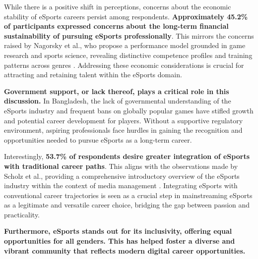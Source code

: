 \documentclass[manuscript,screen,review,anonymous]{acmart}
\begin{document}
While there is a positive shift in perceptions, concerns about the economic stability of eSports careers persist among respondents. \textbf{Approximately 45.2\% of participants expressed concerns about the long-term financial sustainability of pursuing eSports professionally}. This mirrors the concerns raised by Nagorsky et al., who propose a performance model grounded in game research and sports science, revealing distinctive competence profiles and training patterns across genres \cite{a14}. Addressing these economic considerations is crucial for attracting and retaining talent within the eSports domain.

\textbf{Government support, or lack thereof, plays a critical role in this discussion.} In Bangladesh, the lack of governmental understanding of the eSports industry and frequent bans on globally popular games have stifled growth and potential career development for players. Without a supportive regulatory environment, aspiring professionals face hurdles in gaining the recognition and opportunities needed to pursue eSports as a long-term career.

Interestingly, \textbf{53.7\% of respondents desire greater integration of eSports with traditional career paths}. This aligns with the observations made by Scholz et al., providing a comprehensive introductory overview of the eSports industry within the context of media management \cite{a22}. Integrating eSports with conventional career trajectories is seen as a crucial step in mainstreaming eSports as a legitimate and versatile career choice, bridging the gap between passion and practicality.

\textbf{Furthermore, eSports stands out for its inclusivity, offering equal opportunities for all genders. This has helped foster a diverse and vibrant community that reflects modern digital career opportunities.}


\end{document}
